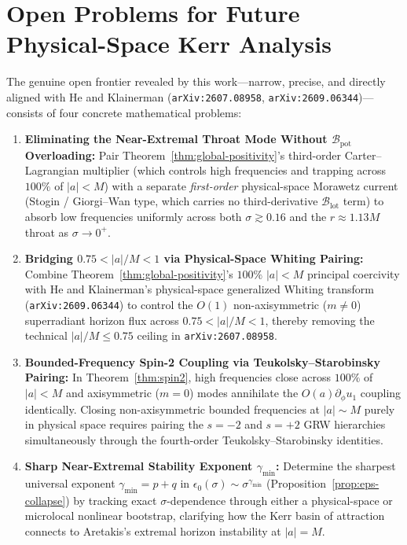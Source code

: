 \documentclass[11pt, a4paper]{article}
\theoremstyle{remark}
\begin{document}
\section{Open Problems for Future Physical-Space Kerr Analysis}
\label{sec:open-problems}

The genuine open frontier revealed by this work---narrow, precise, and directly aligned with He and Klainerman (\texttt{arXiv:2607.08958}, \texttt{arXiv:2609.06344})---consists of four concrete mathematical problems:

\begin{enumerate}
\item \textbf{Eliminating the Near-Extremal Throat Mode Without $\mathcal{B}_{\mathrm{pot}}$ Overloading:} Pair Theorem~\ref{thm:global-positivity}'s third-order Carter--Lagrangian multiplier (which controls high frequencies and trapping across $100\%$ of $|a| < M$) with a separate \emph{first-order} physical-space Morawetz current (Stogin / Giorgi--Wan type, which carries no third-derivative $\mathcal{B}_{\mathrm{lot}}$ term) to absorb low frequencies uniformly across both $\sigma \gtrsim 0.16$ and the $r \approx 1.13M$ throat as $\sigma \to 0^+$.
\item \textbf{Bridging $0.75 < |a|/M < 1$ via Physical-Space Whiting Pairing:} Combine Theorem~\ref{thm:global-positivity}'s $100\%$ $|a| < M$ principal coercivity with He and Klainerman's physical-space generalized Whiting transform (\texttt{arXiv:2609.06344}) to control the $O(1)$ non-axisymmetric ($m \ne 0$) superradiant horizon flux across $0.75 < |a|/M < 1$, thereby removing the technical $|a|/M \le 0.75$ ceiling in \texttt{arXiv:2607.08958}.
\item \textbf{Bounded-Frequency Spin-2 Coupling via Teukolsky--Starobinsky Pairing:} In Theorem~\ref{thm:spin2}, high frequencies close across $100\%$ of $|a| < M$ and axisymmetric ($m = 0$) modes annihilate the $O(a)\partial_\phi u_1$ coupling identically. Closing non-axisymmetric bounded frequencies at $|a| \sim M$ purely in physical space requires pairing the $s = -2$ and $s = +2$ GRW hierarchies simultaneously through the fourth-order Teukolsky--Starobinsky identities.
\item \textbf{Sharp Near-Extremal Stability Exponent $\gamma_{\min}$:} Determine the sharpest universal exponent $\gamma_{\min} = p + q$ in $\epsilon_0(\sigma) \sim \sigma^{\gamma_{\min}}$ (Proposition~\ref{prop:eps-collapse}) by tracking exact $\sigma$-dependence through either a physical-space or microlocal nonlinear bootstrap, clarifying how the Kerr basin of attraction connects to Aretakis's extremal horizon instability at $|a| = M$.
\end{enumerate}
\end{document}
